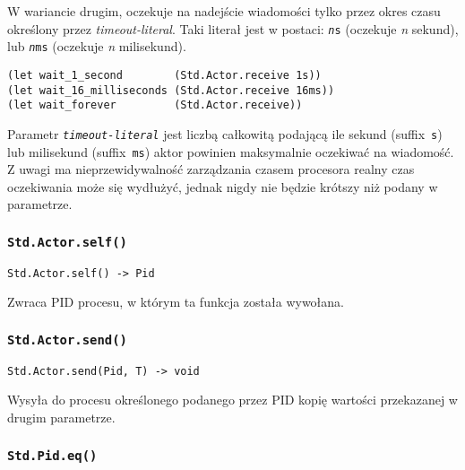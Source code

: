 W wariancie drugim, oczekuje na nadejście wiadomości tylko przez okres czasu
określony przez \emph{timeout-literal}. Taki literał jest w postaci:
\texttt{\emph{n}s} (oczekuje \emph{n} sekund), lub \texttt{\emph{n}ms} (oczekuje
\emph{n} milisekund).

\begin{small}
\begin{lstlisting}
(let wait_1_second        (Std.Actor.receive 1s))
(let wait_16_milliseconds (Std.Actor.receive 16ms))
(let wait_forever         (Std.Actor.receive))
\end{lstlisting}
\end{small}

Parametr \texttt{\emph{timeout-literal}} jest liczbą całkowitą podającą ile
sekund (suffix~\texttt{s}) lub milisekund (suffix~\texttt{ms}) aktor powinien
maksymalnie oczekiwać na wiadomość. Z uwagi ma nieprzewidywalność zarządzania
czasem procesora realny czas oczekiwania może się wydłużyć, jednak nigdy nie
będzie krótszy niż podany w parametrze.

\subsubsection{\texttt{Std.Actor.self()}}

\begin{small}
\begin{lstlisting}
Std.Actor.self() -> Pid
\end{lstlisting}
\end{small}

Zwraca PID procesu, w którym ta funkcja została wywołana.

\subsubsection{\texttt{Std.Actor.send()}}

\begin{small}
\begin{lstlisting}
Std.Actor.send(Pid, T) -> void
\end{lstlisting}
\end{small}

Wysyła do procesu określonego podanego przez PID kopię wartości przekazanej w
drugim parametrze.

\subsubsection{\texttt{Std.Pid.eq()}}

